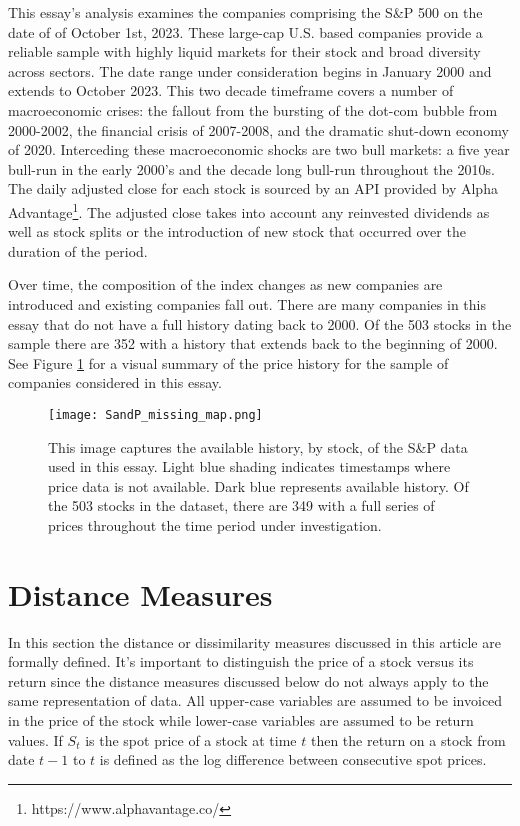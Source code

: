 This essay's analysis examines the companies comprising the S\&P 500 on the date of of October 1st, 2023. These large-cap U.S. based companies provide a reliable sample with highly liquid markets for their stock and broad diversity across sectors. The date range under consideration begins in January 2000 and extends to October 2023. This two decade timeframe covers a number of macroeconomic crises: the fallout from the bursting of the dot-com bubble from 2000-2002, the financial crisis of 2007-2008, and the dramatic shut-down economy of 2020. Interceding these macroeconomic shocks are two bull markets: a five year bull-run in the early 2000's and the decade long bull-run throughout the 2010s. The daily adjusted close for each stock is sourced by an API provided by Alpha Advantage\footnote{https://www.alphavantage.co/}. The adjusted close takes into account any reinvested dividends as well as stock splits or the introduction of new stock that occurred over the duration of the period.

Over time, the composition of the index changes as new companies are introduced and existing companies fall out. There are many companies in this essay that do not have a full history dating back to 2000. Of the 503 stocks in the sample there are 352 with a history that extends back to the beginning of 2000. See Figure \ref{fig:SandP_missing_map} for a visual summary of the price history for the sample of companies considered in this essay.

\begin{figure}
    \centering
    \texttt{[image: SandP\_missing\_map.png]}
    \caption{This image captures the available history, by stock, of the S\&P data used in this essay. Light blue shading indicates timestamps where price data is not available. Dark blue represents available history. Of the 503 stocks in the dataset, there are 349 with a full series of prices throughout the time period under investigation.}
    \label{fig:SandP_missing_map}
\end{figure}

\section{Distance Measures} \label{sec:Distance_Measures}

In this section the distance or dissimilarity measures discussed in this article are formally defined. It's important to distinguish the price of a stock versus its return since the distance measures discussed below do not always apply to the same representation of data. All upper-case variables are assumed to be invoiced in the price of the stock while lower-case variables are assumed to be return values. If $S_{t}$ is the spot price of a stock at time $t$ then the return on a stock from date $t-1$ to $t$ is defined as the log difference between consecutive spot prices.

